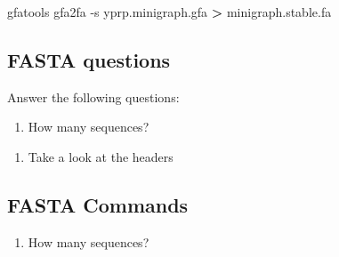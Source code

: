 \documentclass[
]{book}
\newenvironment{Shaded}{\begin{snugshade}}{\end{snugshade}}
\newcommand{\AttributeTok}[1]{\textcolor[rgb]{0.77,0.63,0.00}{#1}}
\newcommand{\ExtensionTok}[1]{#1}
\newcommand{\NormalTok}[1]{#1}
\newcommand{\OperatorTok}[1]{\textcolor[rgb]{0.81,0.36,0.00}{\textbf{#1}}}
\providecommand{\tightlist}{%
  \setlength{\itemsep}{0pt}\setlength{\parskip}{0pt}}
\begin{document}
\begin{Shaded}
\begin{Highlighting}[]
\ExtensionTok{gfatools}\NormalTok{ gfa2fa }\AttributeTok{{-}s}\NormalTok{ yprp.minigraph.gfa }\OperatorTok{\textgreater{}}\NormalTok{ minigraph.stable.fa}
\end{Highlighting}
\end{Shaded}

\hypertarget{fasta-questions}{%
\subsection*{FASTA questions}\label{fasta-questions}}

Answer the following questions:

\begin{enumerate}
\def\labelenumi{\arabic{enumi}.}
\tightlist
\item
  How many sequences?
\end{enumerate}

\begin{Shaded}
\begin{Highlighting}[]

\end{Highlighting}
\end{Shaded}

\begin{enumerate}
\def\labelenumi{\arabic{enumi}.}
\setcounter{enumi}{1}
\tightlist
\item
  Take a look at the headers
\end{enumerate}

\begin{Shaded}
\begin{Highlighting}[]

\end{Highlighting}
\end{Shaded}

\hypertarget{fasta-commands}{%
\subsection*{FASTA Commands}\label{fasta-commands}}

\begin{enumerate}
\def\labelenumi{\arabic{enumi}.}
\tightlist
\item
  How many sequences?
\end{enumerate}
\end{document}
